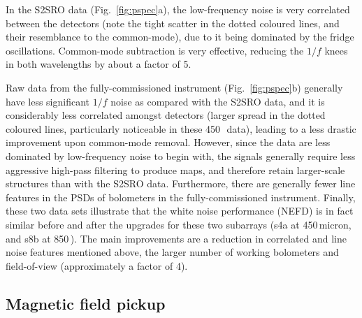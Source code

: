 \documentclass[useAMS,usenatbib,nofootinbib]{mn2e}
\begin{document}
In the S2SRO data (Fig.~\ref{fig:pspec}a), the low-frequency noise is
very correlated between the detectors (note the tight scatter in the
dotted coloured lines, and their resemblance to the common-mode), due
to it being dominated by the fridge oscillations. Common-mode
subtraction is very effective, reducing the $1/f$ knees in both
wavelengths by about a factor of 5.

Raw data from the fully-commissioned instrument
(Fig.~\ref{fig:pspec}b) generally have less significant $1/f$ noise as
compared with the S2SRO data, and it is considerably less correlated
amongst detectors (larger spread in the dotted coloured lines,
particularly noticeable in these 450\,\micron\ data), leading to a
less drastic improvement upon common-mode removal. However, since the
data are less dominated by low-frequency noise to begin with, the
signals generally require less aggressive high-pass filtering to
produce maps, and therefore retain larger-scale structures than with
the S2SRO data. Furthermore, there are generally fewer line features
in the PSDs of bolometers in the fully-commissioned
instrument. Finally, these two data sets illustrate that the white
noise performance (NEFD) is in fact similar before and after the
upgrades for these two subarrays (s4a at 450\,micron, and s8b at
850\,\micron). The main improvements are a reduction in correlated and
line noise features mentioned above, the larger number of working
bolometers and field-of-view (approximately a factor of 4).


\subsection{Magnetic field pickup}
\label{sec:magpickup}
\end{document}
